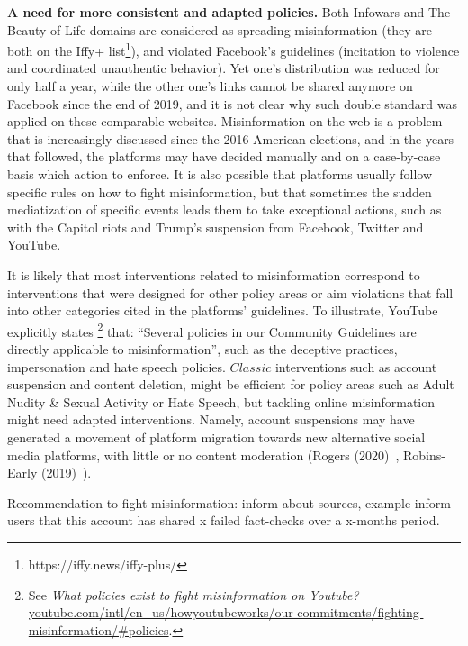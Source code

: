 \documentclass{article}
\begin{document}
\smallskip

{\bf A need for more consistent and adapted policies.}
Both Infowars and The Beauty of Life domains are considered as spreading misinformation (they are both on the Iffy+ list\footnote{https://iffy.news/iffy-plus/}), and violated Facebook's guidelines (incitation to violence and coordinated unauthentic behavior). 
Yet one's distribution was reduced for only half a year, while the other one's links cannot be shared anymore on Facebook since the end of 2019, and it is not clear why such double standard was applied on these comparable websites.
Misinformation on the web is a problem that is increasingly discussed since the 2016 American elections, and in the years that followed, the platforms may have decided manually and on a case-by-case basis which action to enforce.
It is also possible that platforms usually follow specific rules on how to fight misinformation, but that sometimes the sudden mediatization of specific events leads them to take exceptional actions, such as with the Capitol riots and Trump's suspension from Facebook, Twitter and YouTube.

\smallskip

It is likely that most interventions related to misinformation correspond to interventions that were designed for other policy areas or aim violations that fall into other categories cited in the platforms' guidelines.
To illustrate, YouTube explicitly states
\footnote{See {\it What policies exist to fight misinformation on Youtube?} \href{https://www.youtube.com/intl/en\_us/howyoutubeworks/our-commitments/fighting-misinformation/\#policies}{youtube.com/intl/en\_us/howyoutubeworks/our-commitments/fighting-misinformation/\#policies}.}
that: ``Several policies in our Community Guidelines are directly applicable to misinformation'', such as the deceptive practices, impersonation and hate speech policies.
$Classic$ interventions such as account suspension and content deletion, might be efficient for policy areas such as Adult Nudity \& Sexual Activity or Hate Speech, but tackling online misinformation might need adapted interventions.
Namely, account suspensions may have generated a movement of platform migration towards new alternative social media platforms, with little or no content moderation (Rogers (2020)~\cite{rogers2020}, Robins-Early (2019)~\cite{huffpost}).

\smallskip

{\color{brown} Recommendation to fight misinformation: inform about sources, example inform users that this account has shared x failed fact-checks over a x-months period.}
\end{document}
